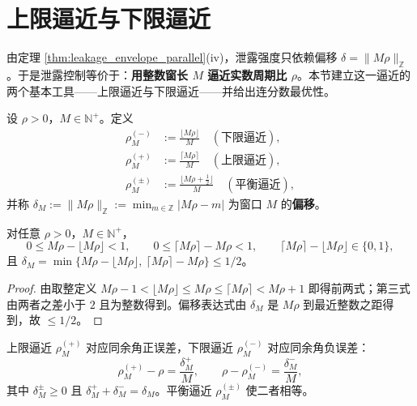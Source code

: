 \section{上限逼近与下限逼近}\label{sec:bounded_approximation}

由定理 \ref{thm:leakage_envelope_parallel}(iv)，泄露强度只依赖偏移 $\delta=\|M\rho\|_{\mathbb{Z}}$。于是泄露控制等价于：\textbf{用整数窗长 $M$ 逼近实数周期比 $\rho$}。本节建立这一逼近的两个基本工具——上限逼近与下限逼近——并给出连分数最优性。

\begin{definition}[上限逼近与下限逼近]\label{def:bounded_approximation_parallel}
设 $\rho>0$，$M\in\mathbb{N}^+$。定义
\[
\begin{aligned}
\rho^{(-)}_M&:=\frac{\lfloor M\rho\rfloor}{M}\quad(\text{下限逼近}),\\
\rho^{(+)}_M&:=\frac{\lceil M\rho\rceil}{M}\quad(\text{上限逼近}),\\
\rho^{(\pm)}_M&:=\frac{\lfloor M\rho+\tfrac12\rfloor}{M}\quad(\text{平衡逼近}),
\end{aligned}
\]
并称 $\delta_M:=\|M\rho\|_{\mathbb{Z}}:=\min_{m\in\mathbb{Z}}|M\rho-m|$ 为窗口 $M$ 的\textbf{偏移}。
\end{definition}

\begin{proposition}[取整不等式]\label{prop:bounds_integrality}
对任意 $\rho>0$，$M\in\mathbb{N}^+$，
\[
0\le M\rho-\lfloor M\rho\rfloor<1,\qquad 0\le\lceil M\rho\rceil-M\rho<1,\qquad
\lceil M\rho\rceil-\lfloor M\rho\rfloor\in\{0,1\},
\]
且 $\delta_M=\min\{M\rho-\lfloor M\rho\rfloor,\ \lceil M\rho\rceil-M\rho\}\le1/2$。
\end{proposition}

\begin{proof}
由取整定义 $M\rho-1<\lfloor M\rho\rfloor\le M\rho\le\lceil M\rho\rceil<M\rho+1$ 即得前两式；第三式由两者之差小于 $2$ 且为整数得到。偏移表达式由 $\delta_M$ 是 $M\rho$ 到最近整数之距得到，故 $\le1/2$。
\end{proof}

\begin{proposition}[上下限逼近的同余角表述]\label{prop:bounded_approx_congruence}
上限逼近 $\rho^{(+)}_M$ 对应同余角正误差，下限逼近 $\rho^{(-)}_M$ 对应同余角负误差：
\[
\rho^{(+)}_M-\rho=\frac{\delta_M^+}{M},\qquad
\rho-\rho^{(-)}_M=\frac{\delta_M^-}{M},
\]
其中 $\delta_M^\pm\ge0$ 且 $\delta_M^++\delta_M^-=\delta_M$。平衡逼近 $\rho^{(\pm)}_M$ 使二者相等。
\end{proposition}

